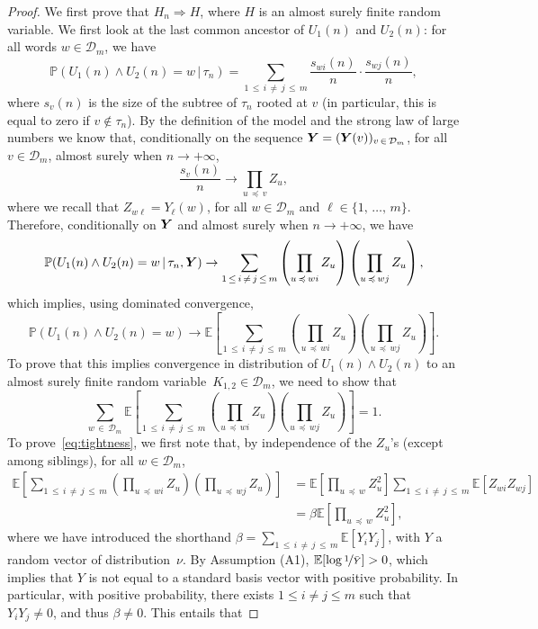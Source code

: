 \documentclass[AHL,Unicode,longabstracts,published]{cedram}
\newcommand{\bs}{\ensuremath{\boldsymbol}}
\newcommand{\bbP}{\mathbb{P}}
\newcommand{\bbE}{\mathbb{E}}
\newcommand{\clD}{\mathcal{D}}
\begin{document}
\begin{proof}
{We first prove that $H_n\Rightarrow H$}, where $H$ is an almost surely finite random variable. We first look at the last common ancestor of $U_1(n)$ and $U_2(n)$: for all words $w\in\clD_m$, we have
\[
\bbP(U_1(n)\wedge U_2(n) = w\, |\, \tau_n) = \sum_{1\,\leq\,i\,\neq\,j\,\leq\,m} \frac{s_{wi}(n)}n\cdot \frac{s_{wj}(n)}n,
\]
where $s_v(n)$ is the size of the subtree of $\tau_n$ rooted at $v$ (in particular, this is equal to zero if $v\notin\tau_n$). By the definition of the model and the strong law of large numbers we know that, conditionally on the sequence $\bs Y = (\bs Y(v))_{v\,\in\,\clD_m}$, for all $v\in\clD_m$, almost surely when $n\to+\infty$,
\[
\frac{s_{v}(n)}n \to \prod_{u\,\preccurlyeq\,v} Z_u,
\]
where we recall that $Z_{w\ell} = Y_\ell(w)$, for all $w\in\clD_m$ and $\ell\in\{1,\,\ldots,\,m\}$. Therefore, conditionally on $\bs Y$ and almost surely when $n\to+\infty$, we have
\[
\bbP(U_1(n)\wedge U_2(n) = w\, |\, \tau_n, \bs Y)
\to \sum_{1\,\leq\,i\,\neq\,j\,\leq\,m} \left(\prod_{u\,\preccurlyeq \,wi}Z_u\right) \left(\prod_{u\,\preccurlyeq\,wj}Z_u\right),
\]
which implies, using dominated convergence,
\[
\bbP(U_1(n)\wedge U_2(n) = w)
\to \bbE\left[\sum_{1\,\leq\,i\,\neq\,j\,\leq\,m} \left(\prod_{u\,\preccurlyeq\,wi}Z_u\right) \left(\prod_{u\,\preccurlyeq\,wj}Z_u\right)\right].
\]
To prove that this implies convergence in distribution of $U_1(n)\wedge U_2(n)$ to an almost surely finite random variable~$K_{1,2}\in\clD_m$, we need to show that
\begin{equation}\label{eq:tightness}
\sum_{w\,\in\,\clD_m}
\bbE\left[\sum_{1\,\leq\,i\,\neq\,j\,\leq\,m} \left(\prod_{u\,\preccurlyeq\,wi}Z_u\right) \left(\prod_{u\,\preccurlyeq\,wj}Z_u\right)\right] = 1.
\end{equation}
To prove~\eqref{eq:tightness}, we first note that, by independence of the $Z_u$'s (except among siblings), for all $w\in\clD_m$,
\begin{align*}
\bbE\left[\sum_{1\,\leq\,i\,\neq\,j\,\leq\,m} \left(\prod_{u\,\preccurlyeq\,wi}Z_u\right) \left(\prod_{u\,\preccurlyeq\,wj}Z_u\right)\right] &= \bbE\left[\prod_{u\,\preccurlyeq\,w}Z^2_u\right]
\sum_{1\,\leq\,i\,\neq\,j\,\leq\,m} \bbE\left[Z_{wi}Z_{wj}\right]\\
&= \beta\bbE\left[\prod_{u\,\preccurlyeq\,w}Z^2_u\right],
\end{align*}
where we have introduced the shorthand $\beta = \sum_{1\,\leq\,i\,\neq\, j\,\leq\,m} \bbE[Y_i Y_j]$, with $Y$ a random vector of distribution~$\nu$. By Assumption (A1), $\bbE[\log \nicefrac1{\bar Y}]>0$, which implies that $Y$ is not equal to a standard basis vector with positive probability. In particular, with positive probability, there exists $1\leq i\neq j\leq m$ such that $Y_iY_j\neq 0$, and thus $\beta\neq 0$. This entails that

\end{proof}
\end{document}
